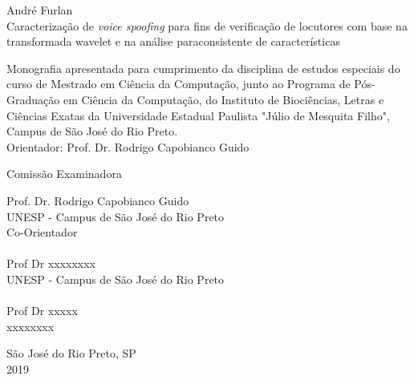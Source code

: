 \documentclass[a4paper,12pt,openright,oneside]{book}
\begin{document}
	\begin{center}
		\vspace{4cm}
		\fontsize{14}{\baselineskip} \selectfont
		\vspace{30.0pt}
		{André Furlan} \\ \vspace{30.0pt}
		{Caracterização de \textit{voice spoofing} para fins de verificação de locutores com base na transformada wavelet e na análise paraconsistente de características} \\ \onehalfspacing \fontsize{14}{\baselineskip} \selectfont
		\par \null
		\begin{flushright}
		\parbox{3.50in}{
			\fontsize{12}{\baselineskip} \selectfont \onehalfspacing
			Monografia apresentada para cumprimento da disciplina de estudos especiais do curso de Mestrado em Ciência da Computação, junto ao Programa de Pós-Graduação em Ciência da Computação, do Instituto de Biociências, Letras e Ciências Exatas da Universidade Estadual Paulista "Júlio de Mesquita Filho", Campus de São José do Rio Preto. \\ \vspace{1.0pt}
			{Orientador: Prof. Dr. Rodrigo Capobianco Guido } \\ \vspace{1.0pt}
		}
		\end{flushright}
		\fontsize{14}{\baselineskip} \selectfont
		Comissão Examinadora \\  \vspace{1.0pt}
	\end{center}

	\fontsize{14}{\baselineskip} \selectfont
	Prof. Dr. Rodrigo Capobianco Guido \\ 
	UNESP - Campus de São José do Rio Preto \\
	Co-Orientador \\\\
	
	Prof Dr xxxxxxxx \\ 
	UNESP - Campus de São José do Rio Preto \\\\
	
	Prof Dr xxxxx \\
	xxxxxxxx \\
	\vspace{3.0cm}

	\begin{center}
		São José do Rio Preto, SP  \\ \vspace{1.0pt}
		2019
	\end{center}
\end{document}
